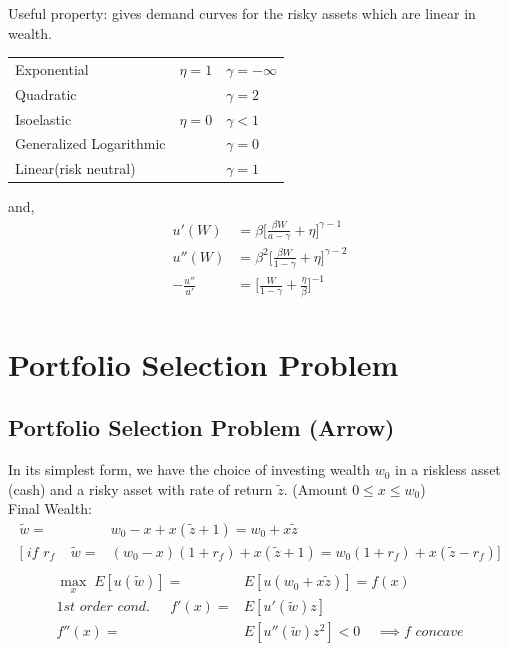 \documentclass[
14pt,notheorems,hyperref={pdfauthor=whatever}
]{beamer}
\begin{document}
\begin{frame}
Useful property: gives demand curves for the risky assets which are linear in wealth.\\
\begin{center}
\begin{tabular}{ l l l }
 Exponential & $\eta = 1$ & $\gamma= -\infty$ \\ 
 Quadratic & & $\gamma = 2$ \\  
 Isoelastic & $\eta = 0$ & $\gamma < 1$ \\
 Generalized Logarithmic &  & $\gamma = 0$ \\
 Linear(risk neutral) &  & $\gamma = 1$
\end{tabular}
\end{center}
and,
\begin{align*}
    u'(W) &= \beta \bigg[\frac{\beta W}{a-\gamma}+\eta\bigg]^{\gamma-1}\\
    u''(W) &= \beta^2 \bigg[\frac{\beta W}{1-\gamma} + \eta\bigg]^{\gamma-2}\\
    -\frac{u''}{u'} &= \bigg[ \frac{W}{1-\gamma}+\frac{\eta}{\beta}\bigg]^{-1}\\
\end{align*}
\end{frame}

\section{Portfolio Selection Problem}
\subsection{Portfolio Selection Problem (Arrow)}
\begin{frame}
In its simplest form, we have the choice of investing wealth $w_0$ in a riskless asset (cash) and a risky asset with rate of return $\tilde z$. (Amount $0 \leq x \leq w_0$)\\
\hfill \break
Final Wealth:
\begin{align*}
    \tilde w =& w_0-x + x(\tilde z+1) = w_0 + x\tilde z\\
    \Bigg[\;\textit{if $r_f$}\;\;\;\; \tilde w =& (w_0-x)(1+r_f)+x(\tilde z+1) = w_0(1+r_f) + x(\tilde z - r_f) \Bigg]\\
\end{align*}
\begin{align*}
    \max_x \; E[u(\tilde w)] =& E[u(w_0+x\tilde z)] = f(x)\\
    \textit{1st order cond. }\;\;\;\; f'(x) =& E[u'(\tilde w)z]\\
    f''(x) =& E[u''(\tilde w)z^2] < 0 \;\;\;\;\implies f \textit{ concave}\\
\end{align*}
\end{frame}
\end{document}
